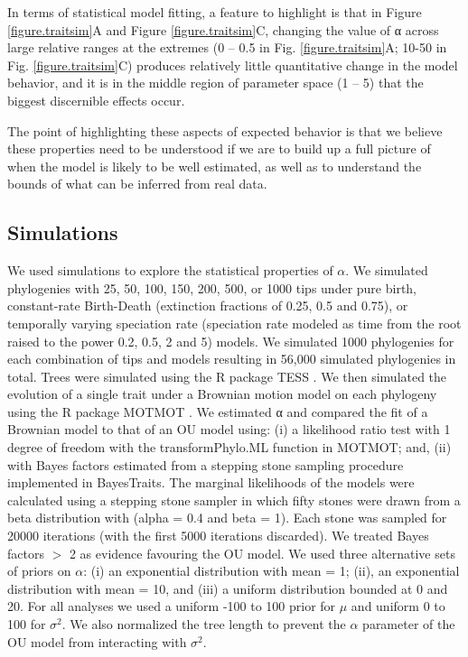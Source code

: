 \documentclass[a4paper,12pt]{article}
\begin{document}
In terms of statistical model fitting, a feature to highlight is that in Figure \ref{figure.traitsim}A and Figure \ref{figure.traitsim}C, changing the value of α across large relative ranges at the extremes (0 – 0.5 in Fig. \ref{figure.traitsim}A; 10-50 in Fig. \ref{figure.traitsim}C) produces relatively little quantitative change in the model behavior, and it is in the middle region of parameter space (1 – 5) that the biggest discernible effects occur.

The point of highlighting these aspects of expected behavior is that we believe these properties need to be understood if we are to build up a full picture of when the model is likely to be well estimated, as well as to understand the bounds of what can be inferred from real data. 

\subsection{Simulations}
\label{section:sims.methods} 
We used simulations to explore the statistical properties of $\alpha$. We simulated phylogenies with 25, 50, 100, 150, 200, 500, or 1000 tips under pure birth, constant-rate Birth-Death (extinction fractions of 0.25, 0.5 and 0.75), or temporally varying speciation rate (speciation rate modeled as time from the root raised to the power 0.2, 0.5, 2 and 5) models. We simulated 1000 phylogenies for each combination of tips and models resulting in 56,000 simulated phylogenies in total. Trees were simulated using the R package TESS \cite{hohna2013fast}. We then simulated the evolution of a single trait under a Brownian motion model on each phylogeny using the R package MOTMOT \citep{Thomas:2011aa}.  We estimated α and compared the fit of a Brownian model to that of an OU model using: (i) a likelihood ratio test with 1 degree of freedom with the transformPhylo.ML function in MOTMOT; and, (ii) with Bayes factors estimated from a stepping stone sampling procedure \citep{xie2010improving}implemented in BayesTraits. The marginal likelihoods of the models were calculated using a stepping stone sampler in which fifty stones were drawn from a beta distribution with (alpha = 0.4 and beta = 1). Each stone was sampled for 20000 iterations (with the first 5000 iterations discarded). We treated Bayes factors $>$ 2 as evidence favouring the OU model. We used three alternative sets of priors on $\alpha$: (i) an exponential distribution with mean = 1; (ii), an exponential distribution with mean = 10, and (iii) a uniform distribution bounded at 0 and 20. For all analyses we used a uniform -100 to 100 prior for $\mu$ and uniform 0 to 100 for $\sigma^2$. We also normalized the tree length to prevent the $\alpha$ parameter of the OU model from interacting with $\sigma^2$.
\end{document}
